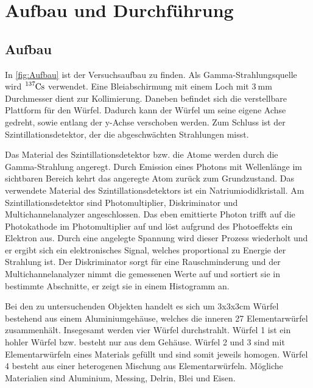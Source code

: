 \section{Aufbau und Durchführung}
\label{sec:Durchführung}

\subsection{Aufbau}
In \autoref{fig:Aufbau} ist der Versuchsaufbau zu finden.
Als Gamma-Strahlungsquelle wird $\ce{^{137}Cs}$ verwendet.
Eine Bleiabschirmung mit einem Loch mit $\SI{3}{\milli\metre}$ Durchmesser dient zur Kollimierung.
Daneben befindet sich die verstellbare Plattform für den Würfel.
Dadurch kann der Würfel um seine eigene Achse gedreht, sowie entlang der y-Achse verschoben werden.
Zum Schluss ist der Szintillationsdetektor, der die abgeschwächten Strahlungen misst.

\noindent
Das Material des Szintillationsdetektor bzw. die Atome werden durch die Gamma-Strahlung angeregt.
Durch Emission eines Photons mit Wellenlänge im sichtbaren Bereich kehrt das angeregte Atom zurück zum Grundzustand.
Das verwendete Material des Szintillationsdetektors ist ein Natriumiodidkristall.
Am Szintillationsdetektor sind Photomultiplier, Diskriminator und Multichannelanalyzer angeschlossen.
Das eben emittierte Photon trifft auf die Photokathode im Photomultiplier auf und löst aufgrund des Photoeffekts ein Elektron aus.
Durch eine angelegte Spannung wird dieser Prozess wiederholt und er ergibt sich ein elektronisches Signal, welches proportional zu Energie der Strahlung ist.
Der Diskriminator sorgt für eine Rauschminderung und der Multichannelanalyzer nimmt die gemessenen Werte auf und sortiert sie in bestimmte Abschnitte, er zeigt sie in einem Histogramm an.

\noindent
Bei den zu untersuchenden Objekten handelt es sich um 3x3x3cm Würfel bestehend aus einem Aluminiumgehäuse, welches die inneren 27 Elementarwürfel zusammenhält.
Insegesamt werden vier Würfel durchstrahlt.
Würfel 1 ist ein hohler Würfel bzw. besteht nur aus dem Gehäuse.
Würfel 2 und 3 sind mit Elementarwürfeln eines Materials gefüllt und sind somit jeweils homogen.
Würfel 4 besteht aus einer heterogenen Mischung aus Elementarwürfeln.
Mögliche Materialien sind Aluminium, Messing, Delrin, Blei und Eisen.


